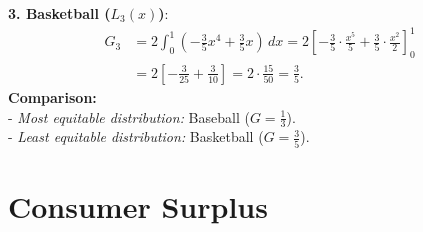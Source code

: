 \documentclass{article}
\begin{document}
\begin{enumerate}[leftmargin=0.5cm, label=\arabic*., rightmargin=0.2cm]
    \textbf{3. Basketball (\(L_3(x)\))}:
    \begin{align*}
        G_3 &= 2 \int_0^1 \left(-\frac{3}{5}x^4 + \frac{3}{5}x\right) \, dx = 2 \left[-\frac{3}{5} \cdot \frac{x^5}{5} + \frac{3}{5} \cdot \frac{x^2}{2}\right]_0^1 \\
        &= 2 \left[-\frac{3}{25} + \frac{3}{10}\right] = 2 \cdot \frac{15}{50} = \frac{3}{5}.
    \end{align*}
    \textbf{Comparison:} \\
    - \textit{Most equitable distribution:} Baseball (\(G = \frac{1}{3}\)). \\
    - \textit{Least equitable distribution:} Basketball (\(G = \frac{3}{5}\)).
    
\end{enumerate}

\section*{Consumer Surplus}
\end{document}
